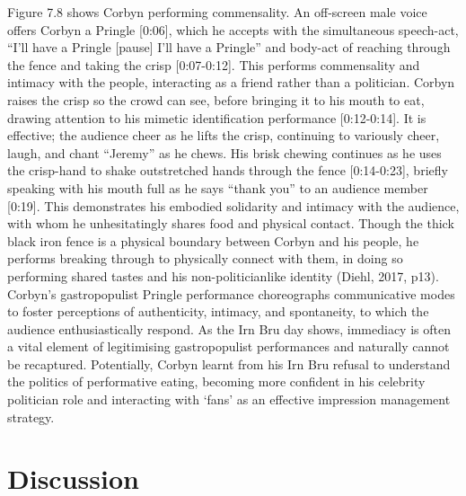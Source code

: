 \documentclass[a4paper, nobind]{templates/ociamthesis}
\begin{document}
Figure 7.8 shows Corbyn performing commensality.
An off-screen male voice offers Corbyn a Pringle {[}0:06{]}, which he accepts with the simultaneous speech-act, ``I'll have a Pringle {[}pause{]} I'll have a Pringle'' and body-act of reaching through the fence and taking the crisp {[}0:07-0:12{]}. This performs commensality and intimacy with the people, interacting as a friend rather than a politician. Corbyn raises the crisp so the crowd can see, before bringing it to his mouth to eat, drawing attention to his mimetic identification performance {[}0:12-0:14{]}. It is effective; the audience cheer as he lifts the crisp, continuing to variously cheer, laugh, and chant ``Jeremy'' as he chews. His brisk chewing continues as he uses the crisp-hand to shake outstretched hands through the fence {[}0:14-0:23{]}, briefly speaking with his mouth full as he says ``thank you'' to an audience member {[}0:19{]}. This demonstrates his embodied solidarity and intimacy with the audience, with whom he unhesitatingly shares food and physical contact. Though the thick black iron fence is a physical boundary between Corbyn and his people, he performs breaking through to physically connect with them, in doing so performing shared tastes and his non-politicianlike identity (Diehl, 2017, p13). Corbyn's gastropopulist Pringle performance choreographs communicative modes to foster perceptions of authenticity, intimacy, and spontaneity, to which the audience enthusiastically respond. As the Irn Bru day shows, immediacy is often a vital element of legitimising gastropopulist performances and naturally cannot be recaptured. Potentially, Corbyn learnt from his Irn Bru refusal to understand the politics of performative eating, becoming more confident in his celebrity politician role and interacting with `fans' as an effective impression management strategy.

\hypertarget{discussion-1}{%
\section*{Discussion}\label{discussion-1}}
\end{document}
